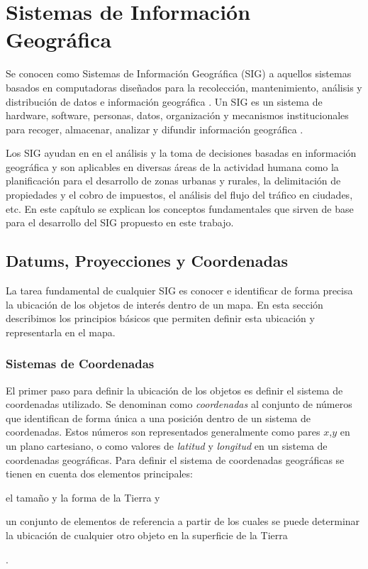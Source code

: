 \chapter{Sistemas de Información Geográfica}

Se conocen como Sistemas de Información Geográfica (SIG) a aquellos sistemas basados en computadoras diseñados para la recolección, mantenimiento, análisis y distribución de datos e información geográfica \cite{bolstad2005gis}. Un SIG es un sistema de hardware, software, personas, datos, organización y mecanismos institucionales para recoger, almacenar, analizar y difundir información geográfica \cite{longley2005geographic}.

Los SIG ayudan en en el análisis y la toma de decisiones basadas en información geográfica y son aplicables en diversas áreas de la actividad humana como la planificación para el desarrollo de zonas urbanas y rurales, la delimitación de propiedades y el cobro de  impuestos, el análisis del flujo del tráfico en ciudades, etc. En este capítulo se explican los conceptos fundamentales que sirven de base para el desarrollo del SIG propuesto en este trabajo.

\section{Datums, Proyecciones y Coordenadas}

La tarea fundamental de cualquier SIG es conocer e identificar de forma precisa la ubicación de los objetos de interés dentro de un mapa. En esta sección describimos los principios básicos que permiten definir esta ubicación y representarla en el mapa.

\subsection{Sistemas de Coordenadas}

El primer paso para definir la ubicación de los objetos es definir el sistema de coordenadas utilizado. Se denominan como \emph{coordenadas} al conjunto de números que identifican de forma única a una posición dentro de un sistema de coordenadas. Estos números son representados generalmente como pares $x$,$y$ en un plano cartesiano, o como valores de \emph{latitud} y \emph{longitud} en un sistema de coordenadas geográficas. Para definir el sistema de coordenadas geográficas se tienen en cuenta dos elementos principales: \begin{enumerate*}[1)] \item el tamaño y la forma de la Tierra y \item un conjunto de elementos de referencia a partir de los cuales se puede determinar la ubicación de cualquier otro objeto en la superficie de la Tierra\end{enumerate*}.

